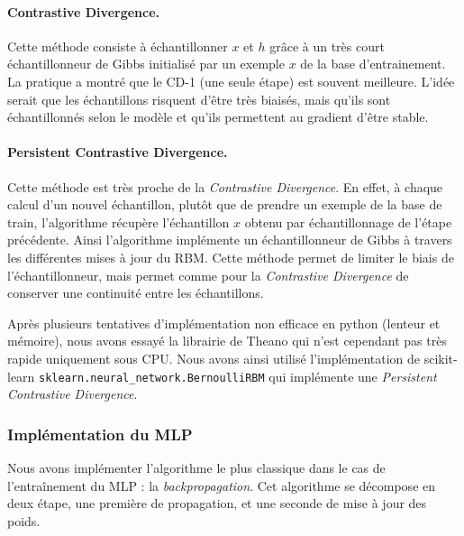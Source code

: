 \documentclass[10pt,a4paper]{article}
\begin{document}
\paragraph{Contrastive Divergence. } Cette méthode consiste à échantillonner $x$ et $h$ grâce à un très court échantillonneur de Gibbs initialisé par un exemple $x$ de la base d'entrainement. La pratique a montré que le CD-1 (une seule étape) est souvent meilleure. L'idée serait que les échantillons risquent d'être très biaisés, mais qu'ils sont échantillonnés selon le modèle et qu'ils permettent au gradient d'être stable.


\paragraph{Persistent Contrastive Divergence. } Cette méthode est très proche de la \textit{Contrastive Divergence}. En effet, à chaque calcul d'un nouvel échantillon, plutôt que de prendre un exemple de la base de train, l'algorithme récupère l'échantillon $x$ obtenu par échantillonnage de l'étape précédente. Ainsi l'algorithme implémente un échantillonneur de Gibbs à travers les différentes mises à jour du RBM. Cette méthode permet de limiter le biais de l'échantillonneur, mais permet comme pour la \textit{Contrastive Divergence} de conserver une continuité entre les échantillons.


Après plusieurs tentatives d'implémentation non efficace en python (lenteur et mémoire), nous avons essayé la librairie de Theano qui n'est cependant pas très rapide uniquement sous CPU. Nous avons ainsi utilisé l'implémentation de scikit-learn \texttt{sklearn.neural\_network.BernoulliRBM} qui implémente une \textit{Persistent Contrastive Divergence}.




\subsubsection{Implémentation du MLP}

Nous avons implémenter l'algorithme le plus classique dans le cas de l'entraînement du MLP : la \emph{backpropagation}. Cet algorithme se décompose en deux étape, une première de propagation, et une seconde de mise à jour des poids. 
\end{document}

